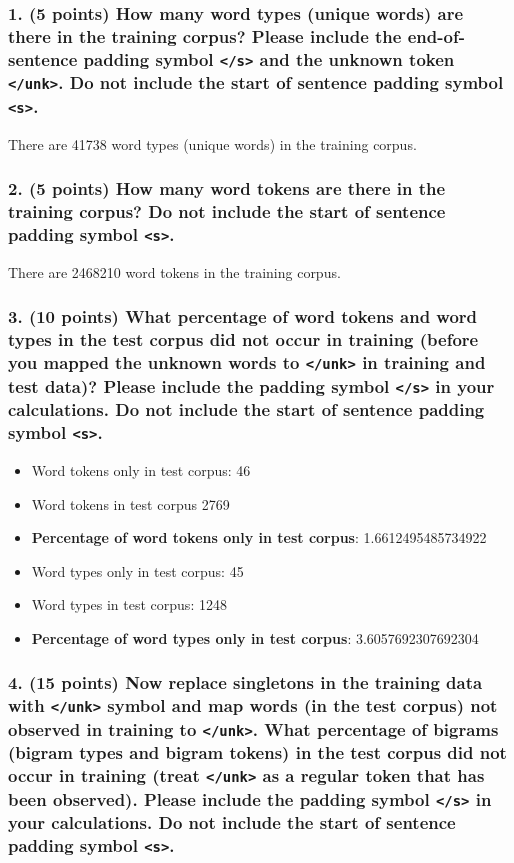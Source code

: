 \documentclass{article}
\begin{document}
\subsubsection*{1. (5 points) How many word types (unique words) are there in the training corpus? Please include the end-of-sentence padding symbol \texttt{</s>} and the unknown token \texttt{</unk>}. Do not include the start of sentence padding symbol \texttt{<s>}.}

There are 41738 word types (unique words) in the training corpus.

\subsubsection*{2. (5 points) How many word tokens are there in the training corpus? Do not include the start of sentence padding symbol \texttt{<s>}.}

There are 2468210 word tokens in the training corpus.

\subsubsection*{3. (10 points) What percentage of word tokens and word types in the test corpus did not occur in training (before you mapped the unknown words to \texttt{</unk>} in training and test data)? Please include the padding symbol \texttt{</s>} in your calculations. Do not include the start of sentence padding symbol \texttt{<s>}.}

\begin{itemize}
\item Word tokens only in test corpus: 46
\item Word tokens in test corpus 2769
\item \textbf{Percentage of word tokens only in test corpus}: 1.6612495485734922
\item Word types only in test corpus: 45
\item Word types in test corpus: 1248
\item \textbf{Percentage of word types only in test corpus}: 3.6057692307692304
\end{itemize}

\subsubsection*{4. (15 points) Now replace singletons in the training data with \texttt{</unk>} symbol and map words (in the test corpus) not observed in training to \texttt{</unk>}. What percentage of bigrams (bigram types and bigram tokens) in the test corpus did not occur in training (treat \texttt{</unk>} as a regular token that has been observed). Please include the padding symbol \texttt{</s>} in your calculations. Do not include the start of sentence padding symbol \texttt{<s>}.}
\end{document}
